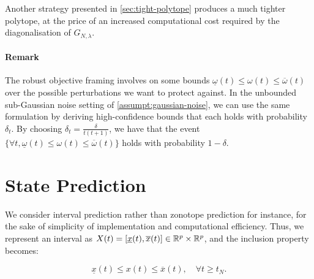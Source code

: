 \documentclass{article}
\begin{document}
Another strategy presented in \autoref{sec:tight-polytope} produces a much tighter polytope, at the price of an increased computational cost required by the diagonalisation of $G_{N,\lambda}$.

\paragraph{Remark} The robust objective framing involves on some bounds $\underline{\omega}(t)\leq \omega(t) \leq \overline{\omega}(t)$ over the possible perturbations we want to protect against. In the unbounded sub-Gaussian noise setting of \autoref{assumpt:gaussian-noise}, we can use the same formulation by deriving high-confidence bounds that each holds with probability $\delta_t$. By choosing $\delta_t = \frac{\delta}{t(t+1)}$, we have that the event $\{\forall t, \underline{\omega}(t) \leq \omega(t) \leq \overline{\omega}(t)\}$ holds with probability $1-\delta$.

\section{State Prediction}

\label{sec:prediction}

We consider interval prediction rather than zonotope prediction for instance, for the sake of simplicity of implementation and computational efficiency. Thus, we represent an interval as $X(t) = [\underline{x}(t), \overline{x}(t)]\in \mathbb{R}^p\times \mathbb{R}^p$, and the inclusion property becomes:

\begin{equation}
\label{eq:inclusion-property}
\underline{x}(t)\leq x(t)\leq\overline{x}(t),\quad\forall t\geq t_N.
\end{equation} 
\end{document}
